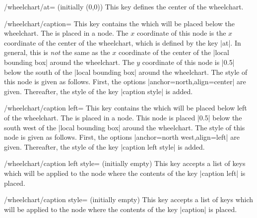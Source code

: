 \documentclass[a4paper,english,dvipsnames]{ltxdoc}
\begin{document}
\begin{key}{/wheelchart/at= (initially (0,0))}
This key defines the center of the wheelchart.
\end{key}
\begin{key}{/wheelchart/caption=}
This key contains the  which will be placed below the wheelchart. The  is placed in a node. The $x$ coordinate of this node is the $x$ coordinate of the center of the wheelchart, which is defined by the key |at|. In general, this is \emph{not} the same as the $x$ coordinate of the center of the |local bounding box| around the wheelchart. The $y$ coordinate of this node is |0.5| below the south of the |local bounding box| around the wheelchart. The style of this node is given as follows. First, the options |anchor=north,align=center| are given. Thereafter, the style of the key |caption style| is added.
\end{key}
\begin{key}{/wheelchart/caption left=}
This key contains the  which will be placed below left of the wheelchart. The  is placed in a node. This node is placed |0.5| below the south west of the |local bounding box| around the wheelchart. The style of this node is given as follows. First, the options |anchor=north west,align=left| are given. Thereafter, the style of the key |caption left style| is added.
\end{key}
\begin{stylekey}{/wheelchart/caption left style= (initially \normalfont empty)}
This key accepts a list of keys which will be applied to the node where the contents of the key |caption left| is placed.
\end{stylekey}
\begin{stylekey}{/wheelchart/caption style= (initially \normalfont empty)}
This key accepts a list of keys which will be applied to the node where the contents of the key |caption| is placed.
\begin{codeexample}[width=10cm]
\end{codeexample}
\end{stylekey}
\end{document}
